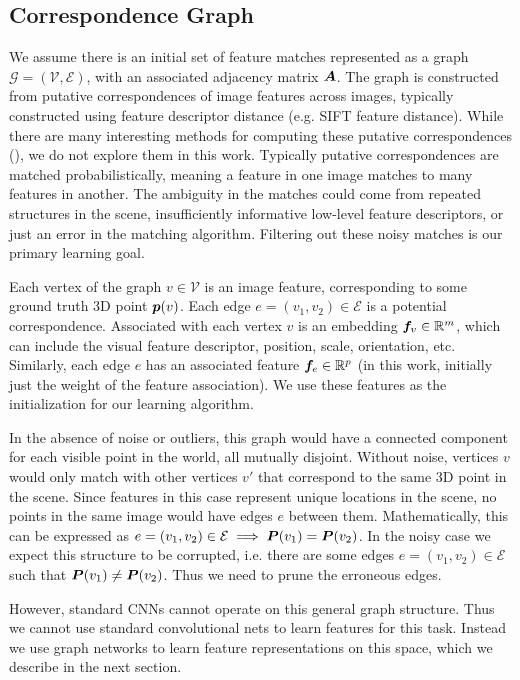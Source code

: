 \documentclass{article} %
\begin{document}
\subsection{Correspondence Graph}
We assume there is an initial set of feature matches represented as a graph $\mathcal{G} = (\mathcal{V}, \mathcal{E})$, with an associated adjacency matrix ${\bm{A}}$.
The graph is constructed from putative correspondences of image features across images, typically constructed using feature descriptor distance (e.g. SIFT feature distance).
While there are many interesting methods for computing these putative correspondences (\cite{suh2015subgraph, yi2018learning}), we do not explore them in this work.
Typically putative correspondences are matched probabilistically, meaning a feature in one image matches to many features in another.
The ambiguity in the matches could come from repeated structures in the scene, insufficiently informative low-level feature descriptors, or just an error in the matching algorithm.
Filtering out these noisy matches is our primary learning goal.

Each vertex of the graph $v \in \mathcal{V}$ is an image feature, corresponding to some ground truth 3D point ${\bm{p}}(v)$.
Each edge $e = (v_1, v_2) \in \mathcal{E}$ is a potential correspondence.
Associated with each vertex $v$ is an embedding ${\bm{f}}_v \in {\mathbb{R}}^m$, which can include the visual feature descriptor, position, scale, orientation, etc.
Similarly, each edge $e$ has an associated feature ${\bm{f}}_e \in {\mathbb{R}}^p$ (in this work, initially just the weight of the feature association).
We use these features as the initialization for our learning algorithm.

In the absence of noise or outliers, this graph would have a connected component for each visible point in the world, all mutually disjoint.
Without noise, vertices $v$ would only match with other vertices $v'$ that correspond to the same 3D point in the scene.
Since features in this case represent unique locations in the scene, no points in the same image would have edges $e$ between them.
Mathematically, this can be expressed as $e = (v_1, v_2) \in \mathcal{E} \implies {\bm{P}}(v_1) = {\bm{P}}(v_2)$.
In the noisy case we expect this structure to be corrupted, i.e. there are some edges $e = (v_1, v_2) \in \mathcal{E}$ such that ${\bm{P}}(v_1) \neq {\bm{P}}(v_2)$.
Thus we need to prune the erroneous edges.

However, standard CNNs cannot operate on this general graph structure.
Thus we cannot use standard convolutional nets to learn features for this task.
Instead we use graph networks to learn feature representations on this space, which we describe in the next section.
\end{document}
